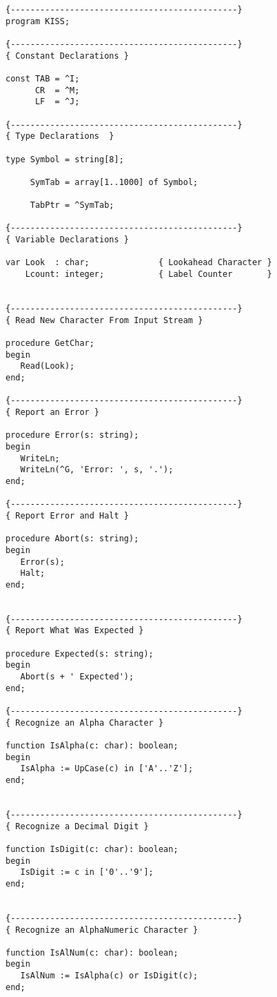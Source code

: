 \begin{verbatim}
{----------------------------------------------}
program KISS;

{----------------------------------------------}
{ Constant Declarations }

const TAB = ^I;
      CR  = ^M;
      LF  = ^J;

{----------------------------------------------}
{ Type Declarations  }

type Symbol = string[8];

     SymTab = array[1..1000] of Symbol;

     TabPtr = ^SymTab;

{----------------------------------------------}
{ Variable Declarations }

var Look  : char;              { Lookahead Character }
    Lcount: integer;           { Label Counter       }


{----------------------------------------------}
{ Read New Character From Input Stream }

procedure GetChar;
begin
   Read(Look);
end;

{----------------------------------------------}
{ Report an Error }

procedure Error(s: string);
begin
   WriteLn;
   WriteLn(^G, 'Error: ', s, '.');
end;

{----------------------------------------------}
{ Report Error and Halt }

procedure Abort(s: string);
begin
   Error(s);
   Halt;
end;


{----------------------------------------------}
{ Report What Was Expected }

procedure Expected(s: string);
begin
   Abort(s + ' Expected');
end;

{----------------------------------------------}
{ Recognize an Alpha Character }

function IsAlpha(c: char): boolean;
begin
   IsAlpha := UpCase(c) in ['A'..'Z'];
end;


{----------------------------------------------}
{ Recognize a Decimal Digit }

function IsDigit(c: char): boolean;
begin
   IsDigit := c in ['0'..'9'];
end;


{----------------------------------------------}
{ Recognize an AlphaNumeric Character }

function IsAlNum(c: char): boolean;
begin
   IsAlNum := IsAlpha(c) or IsDigit(c);
end;


\end{verbatim}
